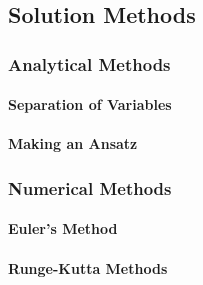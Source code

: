 





\subsection{Solution Methods}

\subsubsection{Analytical Methods}

\paragraph{Separation of Variables}

\paragraph{Making an Ansatz}



\subsubsection{Numerical Methods}

\paragraph{Euler's Method}

\paragraph{Runge-Kutta Methods}

